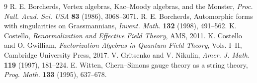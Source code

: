 \documentclass[11pt]{article}
\theoremstyle{definition}
\theoremstyle{remark}
\begin{document}
\begin{thebibliography}{9}
R. E. Borcherds, Vertex algebras, Kac--Moody algebras, and the Monster,
\emph{Proc. Natl. Acad. Sci. USA} \textbf{83} (1986), 3068--3071.
R. E. Borcherds, Automorphic forms with singularities on Grassmannians,
\emph{Invent. Math.} \textbf{132} (1998), 491--562.
K. Costello, \emph{Renormalization and Effective Field Theory},
AMS, 2011.
K. Costello and O. Gwilliam, \emph{Factorization Algebras in Quantum
Field Theory}, Vols. I--II, Cambridge University Press, 2017.
V. Gritsenko and V. Nikulin, \emph{Amer. J. Math.}
\textbf{119} (1997), 181--224.
E. Witten, Chern--Simons gauge theory as a string theory,
\emph{Prog. Math.} \textbf{133} (1995), 637--678.
\end{thebibliography}
\end{document}
